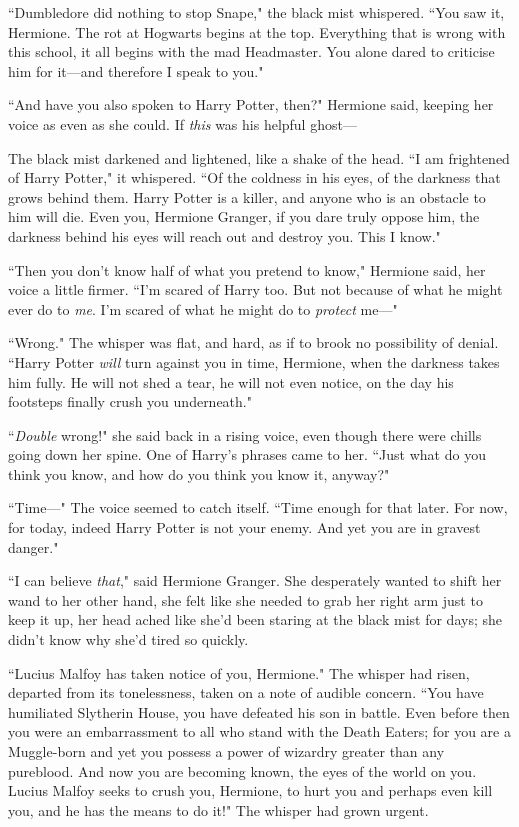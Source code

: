 ``Dumbledore did nothing to stop Snape," the black mist whispered. ``You saw it, Hermione. The rot at Hogwarts begins at the top. Everything that is wrong with this school, it all begins with the mad Headmaster. You alone dared to criticise him for it—and therefore I speak to you."

``And have you also spoken to Harry Potter, then?" Hermione said, keeping her voice as even as she could. If \emph{this} was his helpful ghost—

The black mist darkened and lightened, like a shake of the head. ``I am frightened of Harry Potter," it whispered. ``Of the coldness in his eyes, of the darkness that grows behind them. Harry Potter is a killer, and anyone who is an obstacle to him will die. Even you, Hermione Granger, if you dare truly oppose him, the darkness behind his eyes will reach out and destroy you. This I know."

``Then you don't know half of what you pretend to know," Hermione said, her voice a little firmer. ``I'm scared of Harry too. But not because of what he might ever do to \emph{me}. I'm scared of what he might do to \emph{protect} me—"

``Wrong." The whisper was flat, and hard, as if to brook no possibility of denial. ``Harry Potter \emph{will} turn against you in time, Hermione, when the darkness takes him fully. He will not shed a tear, he will not even notice, on the day his footsteps finally crush you underneath."

``\emph{Double} wrong!" she said back in a rising voice, even though there were chills going down her spine. One of Harry's phrases came to her. ``Just what do you think you know, and how do you think you know it, anyway?"

``Time—" The voice seemed to catch itself. ``Time enough for that later. For now, for today, indeed Harry Potter is not your enemy. And yet you are in gravest danger."

``I can believe \emph{that}," said Hermione Granger. She desperately wanted to shift her wand to her other hand, she felt like she needed to grab her right arm just to keep it up, her head ached like she'd been staring at the black mist for days; she didn't know why she'd tired so quickly.

``Lucius Malfoy has taken notice of you, Hermione." The whisper had risen, departed from its tonelessness, taken on a note of audible concern. ``You have humiliated Slytherin House, you have defeated his son in battle. Even before then you were an embarrassment to all who stand with the Death Eaters; for you are a Muggle-born and yet you possess a power of wizardry greater than any pureblood. And now you are becoming known, the eyes of the world on you. Lucius Malfoy seeks to crush you, Hermione, to hurt you and perhaps even kill you, and he has the means to do it!" The whisper had grown urgent.

